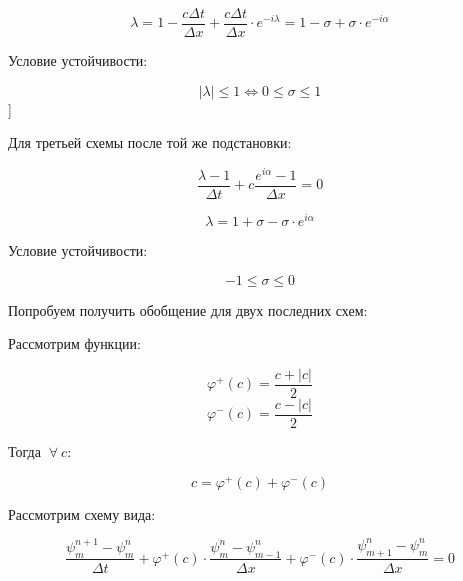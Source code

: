 \documentclass[10pt,a4paper]{article}
\begin{document}
	\begin{equation}
		\lambda = 1 - \frac{c\Delta t}{\Delta x} + \frac{c\Delta t}{\Delta x}
		\cdot e^{-i\lambda} = 1 - \sigma + \sigma\cdot e^{-i\alpha}
	\end{equation}
	
	Условие  устойчивости:
	
	\begin{equation}
		\left|\lambda\right| \leqslant 1 \Leftrightarrow 0\leqslant \sigma 
		\leqslant 1
	\end{equation}]
	
	Для третьей схемы после той же подстановки:
	
	\begin{equation}
		\frac{\lambda - 1}{\Delta t} + c\frac{e^{i\alpha} - 1}{\Delta x} = 0
	\end{equation}
	
	\begin{equation}
		\lambda = 1 + \sigma - \sigma\cdot e^{i\alpha}
	\end{equation}
	
	Условие устойчивости:
	
	\begin{equation}
		-1\leqslant \sigma \leqslant 0
	\end{equation}
	
	Попробуем получить обобщение для двух последних схем:
	
	Рассмотрим функции:
	
	\begin{equation}
		\varphi^{+}\left(c\right) = \frac{c + \left|c\right|}{2}
	\end{equation}
	\begin{equation}
		\varphi^{-}\left(c\right) = \frac{c - \left|c\right|}{2}
	\end{equation}
	
	Тогда $\ \forall \ c:$
	
	\begin{equation}
		c = \varphi^{+}\left(c\right) + \varphi^{-}\left(c\right)
	\end{equation}
	
	Рассмотрим схему вида:
	
	\begin{equation}
		\frac{\psi^{n + 1}_{m} - \psi_{m}^{n}}{\Delta t} + \varphi^{+}\left(c
		\right)\cdot \frac{\psi_{m}^{n} - \psi_{m - 1}^{n}}{\Delta x} + 
		\varphi^{-}\left(c\right)\cdot \frac{\psi_{m + 1}^{n} - \psi_{m}^{n}}
		{\Delta x} = 0
	\end{equation}
	
\end{document}
